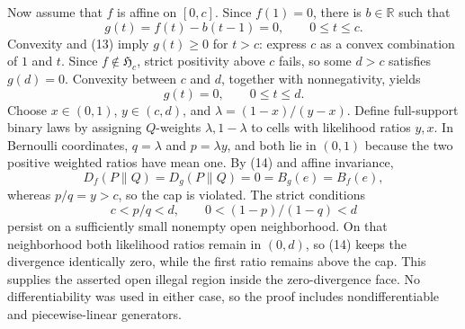Now assume that \(f\) is affine on \([0,c]\).  Since \(f(1)=0\), there is \(b\in\mathbb R\) such that
\[
 g(t)=f(t)-b(t-1)=0,\qquad 0\le t\le c. \tag{13}
\]
Convexity and (13) imply \(g(t)\ge0\) for \(t>c\): express \(c\) as a convex combination of \(1\) and \(t\).  Since \(f\notin\mathfrak H_c\), strict positivity above \(c\) fails, so some \(d>c\) satisfies \(g(d)=0\).  Convexity between \(c\) and \(d\), together with nonnegativity, yields
\[
 g(t)=0,\qquad 0\le t\le d. \tag{14}
\]
Choose \(x\in(0,1)\), \(y\in(c,d)\), and \(\lambda=(1-x)/(y-x)\).  Define full-support binary laws by assigning \(Q\)-weights \(\lambda,1-\lambda\) to cells with likelihood ratios \(y,x\).  In Bernoulli coordinates, \(q=\lambda\) and \(p=\lambda y\), and both lie in \((0,1)\) because the two positive weighted ratios have mean one.  By (14) and affine invariance,
\[
 D_f(P\|Q)=D_g(P\|Q)=0=B_g(e)=B_f(e),
\]
whereas \(p/q=y>c\), so the cap is violated.  The strict conditions
\[
 c<p/q<d,\qquad 0<(1-p)/(1-q)<d
\]
persist on a sufficiently small nonempty open neighborhood.  On that neighborhood both likelihood ratios remain in \((0,d)\), so (14) keeps the divergence identically zero, while the first ratio remains above the cap.  This supplies the asserted open illegal region inside the zero-divergence face.  No differentiability was used in either case, so the proof includes nondifferentiable and piecewise-linear generators.